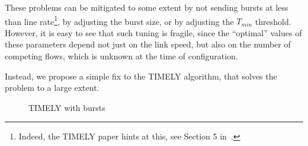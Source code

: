 These problems can be mitigated to some extent by not sending bursts at less
than line rate\footnote{Indeed, the TIMELY paper hints at this, see Section 5
in~\cite{timely}.}, by adjusting the burst size, or by adjusting the $T_{min}$
threshold. However, it is easy to see that such tuning is fragile, since the
``optimal'' values of these parameters depend not just on the link speed, but
also on the number of competing flows, which is unknown at the time of
configuration.

Instead, we propose a simple fix to the TIMELY algorithm, that solves the
problem to a large extent.

\begin{figure}[t]
\center
{}
\caption{TIMELY with bursts}
\label{fig:timely_sim_bursty}
\end{figure}





